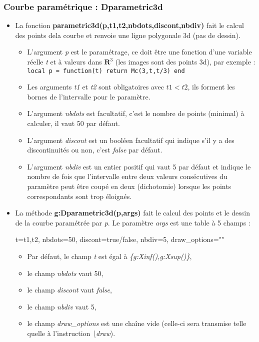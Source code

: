 \documentclass[%
10pt,%
a4paper,%
french,%
]%
{article}%
\begin{document}
\subsubsection{Courbe paramétrique : Dparametric3d}

\begin{itemize}
\item La fonction \textbf{parametric3d(p,t1,t2,nbdots,discont,nbdiv)} fait le calcul des points dela courbe et renvoie une ligne polygonale 3d (pas de dessin).
  \begin{itemize}
    \item L'argument \emph{p} est le paramétrage, ce doit être une fonction d'une variable réelle \emph{t} et à valeurs dans $\mathbf R^3$ (les images sont des points 3d), par exemple :
    \texttt{local p = function(t) return Mc(3,t,t/3) end}
    
    \item  Les arguments \emph{t1} et \emph{t2} sont obligatoires avec \(t1 < t2\), ils forment les bornes de l'intervalle pour le paramètre.
    
    \item L'argument \emph{nbdots} est facultatif, c'est le nombre de points (minimal) à calculer, il vaut 50 par défaut.
    
    \item L'argument \emph{discont} est un booléen facultatif qui indique s'il y a des discontinuités ou non, c'est \emph{false} par défaut.
    
    \item L'argument \emph{nbdiv} est un entier positif qui vaut 5 par défaut et indique le nombre de fois que l'intervalle entre deux valeurs consécutives du paramètre peut être coupé en deux (dichotomie) lorsque les points correspondants sont trop éloignés.
  \end{itemize}
  
\item La méthode \textbf{g:Dparametric3d(p,args)} fait le calcul des points et le dessin de la courbe paramétrée par \emph{p}. Le paramètre \emph{args} est une table à 5 champs :

\begin{TeXcode}
 { t={t1,t2}, nbdots=50, discont=true/false, nbdiv=5, draw_options="" }
\end{TeXcode}

  \begin{itemize}
      \item Par défaut, le champ \emph{t} est égal à \emph{\{g:Xinf(),g:Xsup()\}},
      \item le champ \emph{nbdots} vaut 50, 
      \item le champ \emph{discont} vaut \emph{false},
      \item le champ \emph{nbdiv} vaut 5,
      \item le champ \emph{draw\_options} est une chaîne vide (celle-ci sera transmise telle quelle à l'instruction \emph{\textbackslash draw}).
  \end{itemize}
\end{itemize} 
\end{document}
